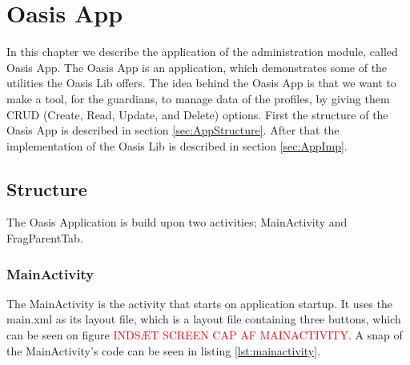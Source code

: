 \chapter{Oasis App}
\label{ch:App}
In this chapter we describe the application of the administration module, called Oasis App. The Oasis App is an application, which demonstrates some of the utilities the Oasis Lib offers. The idea behind the Oasis App is that we want to make a tool, for the guardians, to manage data of the profiles, by giving them CRUD (Create, Read, Update, and Delete) options. First the structure of the Oasis App is described in section \vref{sec:AppStructure}. After that the implementation of the Oasis Lib is described in section \vref{sec:AppImp}.

\section{Structure}
\label{sec:AppStructure}
The Oasis Application is build upon two activities; MainActivity and FragParentTab.

\subsection{MainActivity}
The MainActivity is the activity that starts on application startup. It uses the main.xml as its layout file, which is a layout file containing three buttons, which can be seen on figure \textcolor{red}{INDS\AE{}T SCREEN CAP AF MAINACTIVITY}. A snap of the MainActivity's code can be seen in listing \vref{lst:mainactivity}.

